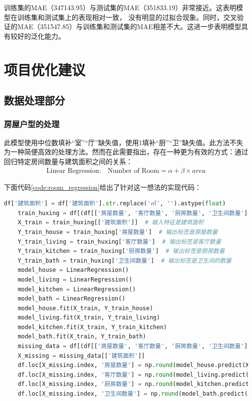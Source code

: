 \documentclass[
    report,     %
    oneside,    %
    UTF8,       %
    zihao=-4    %
]{config} %
\begin{document}
训练集的MAE（347143.95）与测试集的MAE（351833.19）非常接近。这表明模型在训练集和测试集上的表现相对一致，
没有明显的过拟合现象。同时，交叉验证的MAE（351547.85）与训练集和测试集的MAE相差不大。这进一步表明模型具有较好的泛化能力。

\chapter{项目优化建议}

\section{数据处理部分}

\subsection{房屋户型的处理}

此模型使用中位数填补“室”“厅”缺失值，使用1填补“厨”“卫”缺失值。此方法不失为一种简便高效的处理方法。然而在此需要指出，存在一种更为有效的方式：通过回归特定房间数量与建筑面积之间的关系：
\begin{align}
    \text{Linear Regression:}\quad\text{Number of Room}=\alpha+\beta\times area
\end{align}

下面代码\ref{code:room_regression}给出了针对这一想法的实现代码：

\begin{lstlisting}[label=code:room_regression, language=Python, caption=房屋户型的处理修改代码]
    df['建筑面积'] = df['建筑面积'].str.replace('㎡', '').astype(float)
    train_huxing = df[(df[['房屋数量', '客厅数量', '厨房数量', '卫生间数量']] != 0).all(axis=1)]
    X_train = train_huxing[['建筑面积']]  # 输入特征是建筑面积
    Y_train_house = train_huxing['房屋数量']  # 输出标签是房屋数量
    Y_train_living = train_huxing['客厅数量']  # 输出标签是客厅数量
    Y_train_kitchen = train_huxing['厨房数量']  # 输出标签是厨房数量
    Y_train_bath = train_huxing['卫生间数量']  # 输出标签是卫生间的数量
    model_house = LinearRegression()
    model_living = LinearRegression()
    model_kitchen = LinearRegression()
    model_bath = LinearRegression()
    model_house.fit(X_train, Y_train_house)
    model_living.fit(X_train, Y_train_living)
    model_kitchen.fit(X_train, Y_train_kitchen)
    model_bath.fit(X_train, Y_train_bath)
    missing_data = df[(df[['房屋数量', '客厅数量', '厨房数量', '卫生间数量']] == 0).any(axis=1)    ]
    X_missing = missing_data[['建筑面积']]
    df.loc[X_missing.index, '房屋数量'] = np.round(model_house.predict(X_missing)).astype(int)
    df.loc[X_missing.index, '客厅数量'] = np.round(model_living.predict(X_missing)).astype(int)
    df.loc[X_missing.index, '厨房数量'] = np.round(model_kitchen.predict(X_missing)).astype(int)
    df.loc[X_missing.index, '卫生间数量'] = np.round(model_bath.predict(X_missing)).astype(int)
\end{lstlisting}
\end{document}
